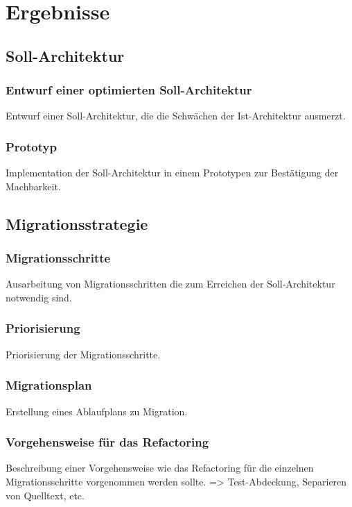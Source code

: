 \chapter{Ergebnisse}



\section{Soll-Architektur}
\subsection{Entwurf einer optimierten Soll-Architektur}
Entwurf einer Soll-Architektur, die die Schwächen der Ist-Architektur ausmerzt.

\subsection{Prototyp}
Implementation der Soll-Architektur in einem Prototypen zur Bestätigung der Machbarkeit.

\section{Migrationsstrategie}
\subsection{Migrationsschritte}
Ausarbeitung von Migrationsschritten die zum Erreichen der Soll-Architektur notwendig sind.

\subsection{Pri­o­ri­sie­rung}
Pri­o­ri­sie­rung der Migrationsschritte.

\subsection{Migrationsplan}
Erstellung eines Ablaufplans zu Migration.

\subsection{Vorgehensweise für das Refactoring}
Beschreibung einer Vorgehensweise wie das Refactoring für die einzelnen Migrationsschritte vorgenommen werden sollte.
=> Test-Abdeckung, Separieren von Quelltext, etc.
